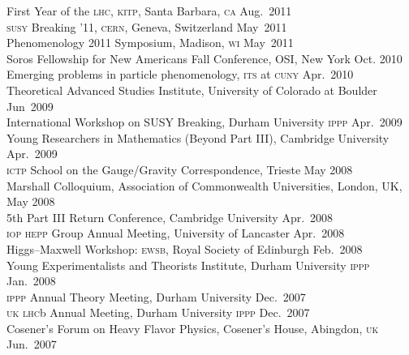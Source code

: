 \documentclass[margin,line]{resume}
\newcommand{\scap}[1]{\textsc{\MakeLowercase{#1}}}
\begin{document}
\begin{resume}
%
First Year of the \scap{LHC}, \scap{KITP}, Santa Barbara, \scap{CA}
\hfill 
Aug.~2011\vspace{.7mm}\\
%
\scap{SUSY} Breaking '11, \scap{CERN}, Geneva, Switzerland
\hfill
May~2011\vspace{.7mm}\\
%
Phenomenology 2011 Symposium, Madison, \scap{WI}
\hfill 
May~2011\vspace{.7mm}\\
%
Soros Fellowship for New Americans Fall Conference, OSI, New York
\hfill 
Oct. 2010\vspace{.7mm}\\
% 
Emerging problems in particle phenomenology, \scap{ITS} at \scap{CUNY}
\hfill 
Apr.~2010\vspace{.7mm}\\
%
Theoretical Advanced Studies Institute, University of Colorado at Boulder
\hfill 
Jun~2009\vspace{.7mm}\\
%
International Workshop on SUSY Breaking, Durham University \scap{IPPP}
\hfill 
Apr.~2009\vspace{.7mm}\\
%
Young Researchers in Mathematics (Beyond Part III), Cambridge University
\hfill 
Apr.~2009\vspace{.7mm}\\
%
\scap{ICTP} School on the Gauge/Gravity Correspondence, Trieste
\hfill 
May 2008\vspace{.7mm}\\
%
Marshall Colloquium, Association of Commonwealth Universities, London, UK, \hfill May 2008\vspace{.7mm}\\
%
5th Part III Return Conference, Cambridge University
\hfill 
Apr.~2008\vspace{.7mm}\\
%
\scap{IOP HEPP} Group Annual Meeting, University of Lancaster
\hfill 
Apr.~2008\vspace{.7mm}\\
%
Higgs--Maxwell Workshop: \scap{EWSB}, Royal Society of Edinburgh
\hfill %
Feb.~2008\vspace{.7mm}\\
%
Young Experimentalists and Theorists Institute, Durham University \scap{IPPP}%
\hfill %
Jan.~2008\vspace{.7mm}\\
%
\scap{IPPP} Annual Theory Meeting, Durham University
\hfill%
Dec.~2007\vspace{.7mm}\\
%
\scap{UK LHC}b Annual Meeting, Durham University \scap{IPPP}
\hfill%
Dec.~2007\vspace{.7mm}\\	
%
Cosener's Forum on Heavy Flavor Physics, Cosener's House, Abingdon, \scap{UK}
\hfill%
Jun.~2007\vspace{.7mm}\\ 


\end{resume}
\end{document}
